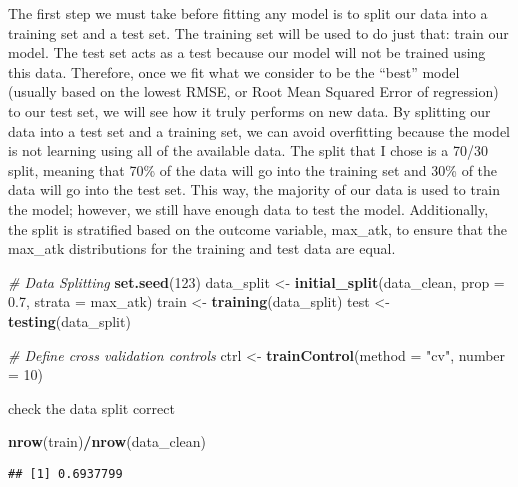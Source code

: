 \documentclass[
]{article}
\newenvironment{Shaded}{\begin{snugshade}}{\end{snugshade}}
\newcommand{\AttributeTok}[1]{\textcolor[rgb]{0.13,0.29,0.53}{#1}}
\newcommand{\CommentTok}[1]{\textcolor[rgb]{0.56,0.35,0.01}{\textit{#1}}}
\newcommand{\DecValTok}[1]{\textcolor[rgb]{0.00,0.00,0.81}{#1}}
\newcommand{\FloatTok}[1]{\textcolor[rgb]{0.00,0.00,0.81}{#1}}
\newcommand{\FunctionTok}[1]{\textcolor[rgb]{0.13,0.29,0.53}{\textbf{#1}}}
\newcommand{\NormalTok}[1]{#1}
\newcommand{\OtherTok}[1]{\textcolor[rgb]{0.56,0.35,0.01}{#1}}
\newcommand{\SpecialCharTok}[1]{\textcolor[rgb]{0.81,0.36,0.00}{\textbf{#1}}}
\newcommand{\StringTok}[1]{\textcolor[rgb]{0.31,0.60,0.02}{#1}}
\begin{document}
The first step we must take before fitting any model is to split our
data into a training set and a test set. The training set will be used
to do just that: train our model. The test set acts as a test because
our model will not be trained using this data. Therefore, once we fit
what we consider to be the ``best'' model (usually based on the lowest
RMSE, or Root Mean Squared Error of regression) to our test set, we will
see how it truly performs on new data. By splitting our data into a test
set and a training set, we can avoid overfitting because the model is
not learning using all of the available data. The split that I chose is
a 70/30 split, meaning that 70\% of the data will go into the training
set and 30\% of the data will go into the test set. This way, the
majority of our data is used to train the model; however, we still have
enough data to test the model. Additionally, the split is stratified
based on the outcome variable, max\_atk, to ensure that the max\_atk
distributions for the training and test data are equal.

\begin{Shaded}
\begin{Highlighting}[]
\CommentTok{\# Data Splitting}
\FunctionTok{set.seed}\NormalTok{(}\DecValTok{123}\NormalTok{)}
\NormalTok{data\_split }\OtherTok{\textless{}{-}} \FunctionTok{initial\_split}\NormalTok{(data\_clean, }\AttributeTok{prop =} \FloatTok{0.7}\NormalTok{, }\AttributeTok{strata =}\NormalTok{ max\_atk)}
\NormalTok{train }\OtherTok{\textless{}{-}} \FunctionTok{training}\NormalTok{(data\_split)}
\NormalTok{test }\OtherTok{\textless{}{-}} \FunctionTok{testing}\NormalTok{(data\_split)}

\CommentTok{\# Define cross validation controls}
\NormalTok{ctrl }\OtherTok{\textless{}{-}} \FunctionTok{trainControl}\NormalTok{(}\AttributeTok{method =} \StringTok{"cv"}\NormalTok{, }\AttributeTok{number =} \DecValTok{10}\NormalTok{)}
\end{Highlighting}
\end{Shaded}

check the data split correct

\begin{Shaded}
\begin{Highlighting}[]
\FunctionTok{nrow}\NormalTok{(train)}\SpecialCharTok{/}\FunctionTok{nrow}\NormalTok{(data\_clean)}
\end{Highlighting}
\end{Shaded}

\begin{verbatim}
## [1] 0.6937799
\end{verbatim}
\end{document}
